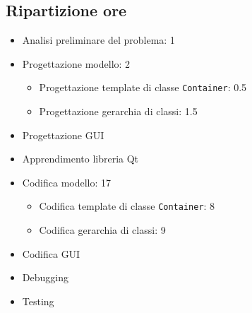 \documentclass{article}
\newcommand{\code}[1]{\texttt{#1}}
\begin{document}
\subsection{Ripartizione ore} %
\label{sub:ripartizione_ore}
\begin{itemize}
	\item Analisi preliminare del problema: 1
	\item Progettazione modello: 2
	\begin{itemize}
		\item Progettazione template di classe \code{Container}: 0.5
		\item Progettazione gerarchia di classi: 1.5
	\end{itemize}
	\item Progettazione GUI
	\item Apprendimento libreria Qt
	\item Codifica modello: 17
	\begin{itemize}
		\item Codifica template di classe \code{Container}: 8
		\item Codifica gerarchia di classi: 9
	\end{itemize}
	\item Codifica GUI
	\item Debugging
	\item Testing
\end{itemize}
\end{document}
